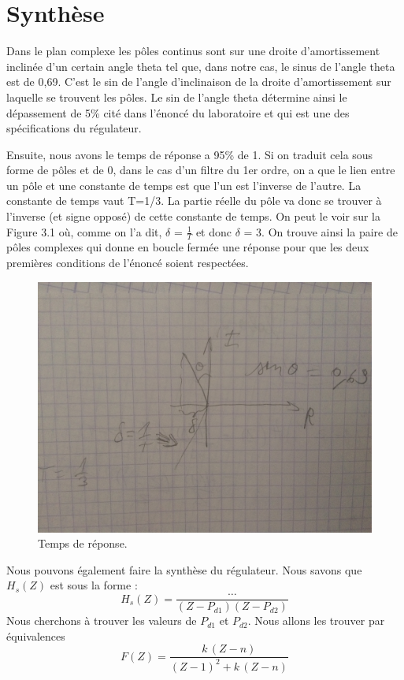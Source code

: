 \section{Synthèse}

Dans le plan complexe les pôles continus sont sur une droite d’amortissement inclinée d’un certain angle theta tel que, dans notre cas, le sinus de l'angle theta est de 0,69. C'est le sin de l’angle d’inclinaison de la droite d’amortissement sur laquelle se trouvent les pôles. Le sin de l'angle theta détermine ainsi le dépassement de 5\% cité dans l'énoncé du laboratoire et qui est une des spécifications du régulateur.

Ensuite, nous avons le temps de réponse a 95\% de 1. Si on traduit cela sous forme de pôles et de 0, dans le cas d'un filtre du 1er ordre, on a que le lien entre un pôle et une constante de temps est que l'un est l’inverse de l’autre. La constante de temps vaut T=1/3.
La partie réelle du pôle va donc se trouver à l’inverse (et signe opposé) de cette constante de temps. On peut le voir sur la Figure 3.1 où, comme on l'a dit, $\delta$ = $\frac{1}{T}$ et donc $\delta$ = 3. On trouve ainsi la paire de pôles complexes  qui donne en boucle fermée une réponse pour que les deux premières conditions de l'énoncé soient respectées.


\begin{figure}[!ht]
\centering
	\includegraphics[scale=0.1]{images/IMG_1681.jpg}
	\caption{Temps de réponse.}
	\label{fig:temps de réponse}
\end{figure}


Nous pouvons également faire la synthèse du régulateur.
Nous savons que $H_s(Z)$ est sous la forme :
\begin{equation}
	H_s(Z) = \frac{\dots}{(Z-P_{d1})(Z-P_{d2})}
\end{equation}
Nous cherchons à trouver les valeurs de $P_{d1}$ et $P_{d2}$.
Nous allons les trouver par équivalences
\begin{equation}
	F(Z) = \frac{k\,(Z-n)}{(Z-1)^2+k\,(Z-n)}
\end{equation}

